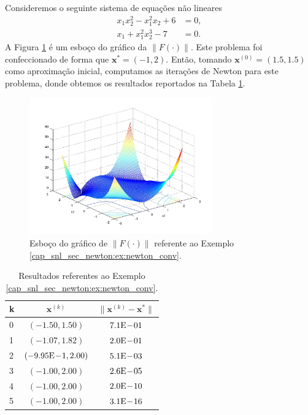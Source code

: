 \begin{ex}\label{cap_snl_sec_newton:ex:newton_conv}
  Consideremos o seguinte sistema de equações não lineares
  \begin{align}
    x_1x_2^2 - x_1^2x_2 + 6 &= 0,\\
    x_1 + x_1^2x_2^3 - 7 &= 0.
  \end{align}
  A Figura \ref{cap_snl_sec_newton:fig:ex_newton_conv} é um esboço do gráfico da $\|F(\cdot)\|$. Este problema foi confeccionado de forma que $\pmb{x}^* = (-1, 2)$. Então, tomando $\pmb{x}^{(0)} = (1.5, 1.5)$ como aproximação inicial, computamos as iterações de Newton para este problema, donde obtemos os resultados reportados na Tabela \ref{cap_snl_sec_newton:tab:ex_newton_conv}. 

  \begin{figure}[h!]
    \centering
    \includegraphics[width=0.7\textwidth]{./cap_snl/dados/ex_newton_conv/ex_newton_conv}
    \caption{Esboço do gráfico de $\|F(\cdot)\|$ referente ao Exemplo \ref{cap_snl_sec_newton:ex:newton_conv}.}
    \label{cap_snl_sec_newton:fig:ex_newton_conv}
  \end{figure}

  \begin{table}[H]
    \centering
    \begin{tabular}{lcc}
      k & $\pmb{x}^{(k)}$ & $\|\pmb{x}^{(k)} - \pmb{x}^*\|$\\\hline
      0 & $(-1.50, 1.50)$ & $7.1\mathrm{E}\!-\!01$\\
      1 & $(-1.07, 1.82)$ & $2.0\mathrm{E}\!-\!01$\\
      2 & $(-9.95\mathrm{E}\!-\!1, 2.00)$ & $5.1\mathrm{E}\!-\!03$\\
      3 & $(-1.00, 2.00)$ & $2.6\mathrm{E}\!-\!05$ \\
      4 & $(-1.00, 2.00)$ & $2.0\mathrm{E}\!-\!10$ \\
      5 & $(-1.00, 2.00)$ & $3.1\mathrm{E}\!-\!16$ \\\hline
    \end{tabular}
    \caption{Resultados referentes ao Exemplo \ref{cap_snl_sec_newton:ex:newton_conv}.}
    \label{cap_snl_sec_newton:tab:ex_newton_conv}
  \end{table}
\end{ex}


